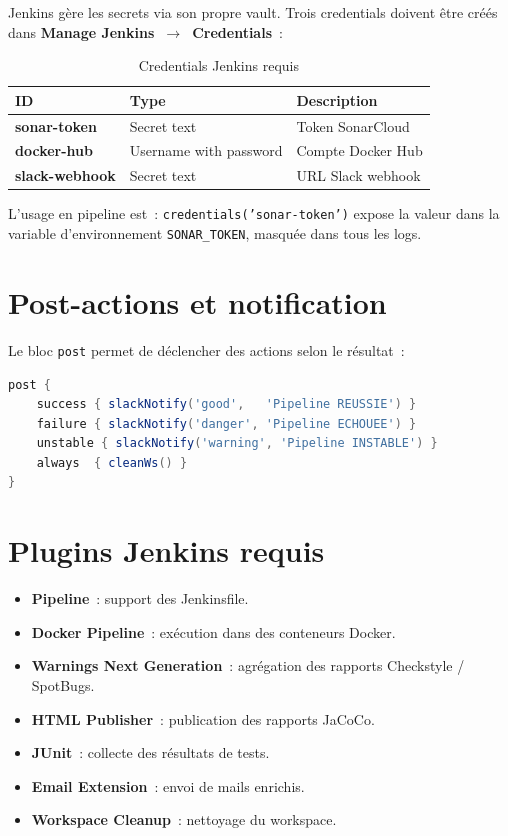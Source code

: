 \documentclass[12pt,a4paper]{report}
\begin{document}
Jenkins gère les secrets via son propre vault. Trois credentials doivent être
créés dans \textbf{Manage Jenkins~$\to$~Credentials}~:

\begin{table}[h!]
\centering
\small
\begin{tabular}{>{\bfseries}p{3cm} p{4cm} p{5cm}}
\toprule
ID & Type & Description \\
\midrule
sonar-token   & Secret text          & Token SonarCloud \\
docker-hub    & Username with password & Compte Docker Hub \\
slack-webhook & Secret text          & URL Slack webhook \\
\bottomrule
\end{tabular}
\caption{Credentials Jenkins requis}
\end{table}

L'usage en pipeline est~: \texttt{credentials('sonar-token')} expose la valeur
dans la variable d'environnement \texttt{SONAR\_TOKEN}, masquée dans tous les
logs.

\section{Post-actions et notification}

Le bloc \texttt{post} permet de déclencher des actions selon le résultat~:

\begin{lstlisting}[language=Groovy, caption={Post-actions Jenkins}]
post {
    success { slackNotify('good',   'Pipeline REUSSIE') }
    failure { slackNotify('danger', 'Pipeline ECHOUEE') }
    unstable { slackNotify('warning', 'Pipeline INSTABLE') }
    always  { cleanWs() }
}
\end{lstlisting}

\section{Plugins Jenkins requis}

\begin{itemize}
  \item \textbf{Pipeline}~: support des Jenkinsfile.
  \item \textbf{Docker Pipeline}~: exécution dans des conteneurs Docker.
  \item \textbf{Warnings Next Generation}~: agrégation des rapports Checkstyle / SpotBugs.
  \item \textbf{HTML Publisher}~: publication des rapports JaCoCo.
  \item \textbf{JUnit}~: collecte des résultats de tests.
  \item \textbf{Email Extension}~: envoi de mails enrichis.
  \item \textbf{Workspace Cleanup}~: nettoyage du workspace.
\end{itemize}
\end{document}
